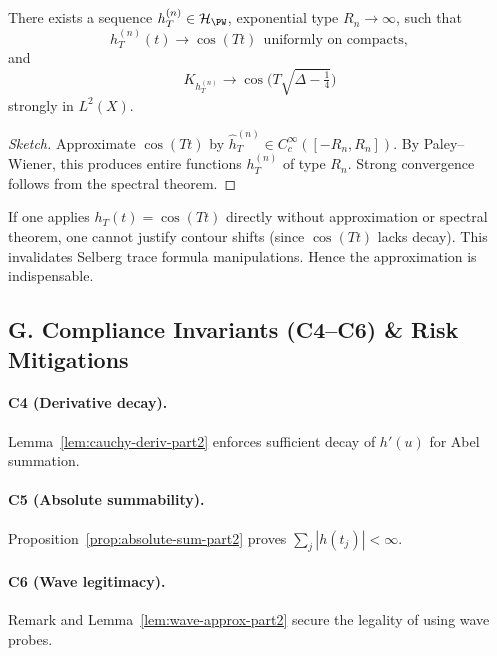 \begin{lemma}
\label{lem:wave-approx-part2}
There exists a sequence $h_T^{(n)}\in\mathcal H_{\PW}$, exponential type $R_n\to\infty$, such that
\[
  h_T^{(n)}(t)\to \cos(Tt)\ \ \text{uniformly on compacts},
\]
and
\[
  K_{h_T^{(n)}}\to \cos\!\big(T\sqrt{\Delta-\tfrac14}\big)
\]
strongly in $L^2(X)$.
\end{lemma}

\begin{proof}[Sketch]
Approximate $\cos(Tt)$ by $\hat h_T^{(n)}\in C_c^\infty([-R_n,R_n])$. By Paley–Wiener, this produces entire functions $h_T^{(n)}$ of type $R_n$. Strong convergence follows from the spectral theorem.
\end{proof}

\begin{counterexample}
If one applies $h_T(t)=\cos(Tt)$ directly without approximation or spectral theorem, one cannot justify contour shifts (since $\cos(Tt)$ lacks decay). This invalidates Selberg trace formula manipulations. Hence the approximation is indispensable.
\end{counterexample}


\subsection*{G. Compliance Invariants (C4–C6) \& Risk Mitigations}
\label{subsec:invariants-part2}

\paragraph{C4 (Derivative decay).}
Lemma~\ref{lem:cauchy-deriv-part2} enforces sufficient decay of $h'(u)$ for Abel summation.

\paragraph{C5 (Absolute summability).}
Proposition~\ref{prop:absolute-sum-part2} proves $\sum_j |h(t_j)|<\infty$.

\paragraph{C6 (Wave legitimacy).}
Remark and Lemma~\ref{lem:wave-approx-part2} secure the legality of using wave probes.

